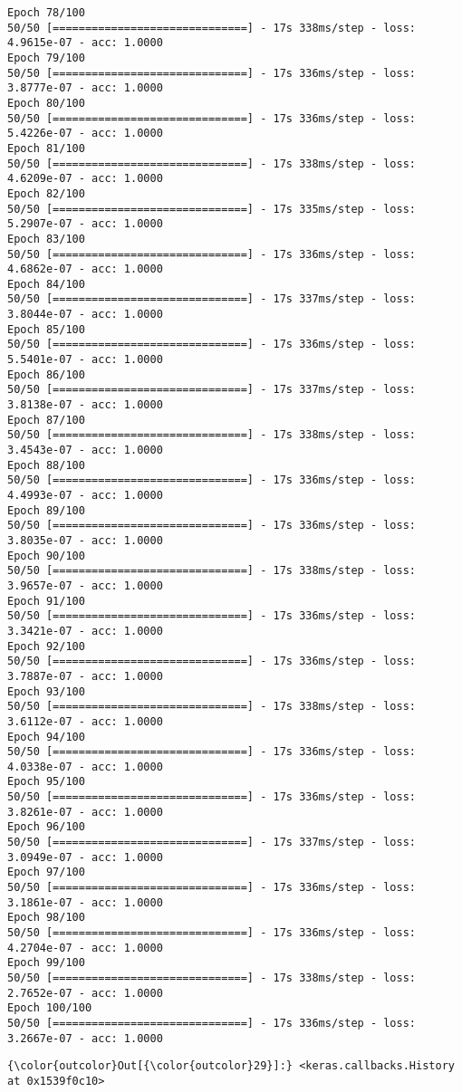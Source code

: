 \documentclass[11pt]{article}
\begin{document}
\begin{Verbatim}[commandchars=\\\{\}]
Epoch 78/100
50/50 [==============================] - 17s 338ms/step - loss: 4.9615e-07 - acc: 1.0000
Epoch 79/100
50/50 [==============================] - 17s 336ms/step - loss: 3.8777e-07 - acc: 1.0000
Epoch 80/100
50/50 [==============================] - 17s 336ms/step - loss: 5.4226e-07 - acc: 1.0000
Epoch 81/100
50/50 [==============================] - 17s 338ms/step - loss: 4.6209e-07 - acc: 1.0000
Epoch 82/100
50/50 [==============================] - 17s 335ms/step - loss: 5.2907e-07 - acc: 1.0000
Epoch 83/100
50/50 [==============================] - 17s 336ms/step - loss: 4.6862e-07 - acc: 1.0000
Epoch 84/100
50/50 [==============================] - 17s 337ms/step - loss: 3.8044e-07 - acc: 1.0000
Epoch 85/100
50/50 [==============================] - 17s 336ms/step - loss: 5.5401e-07 - acc: 1.0000
Epoch 86/100
50/50 [==============================] - 17s 337ms/step - loss: 3.8138e-07 - acc: 1.0000
Epoch 87/100
50/50 [==============================] - 17s 338ms/step - loss: 3.4543e-07 - acc: 1.0000
Epoch 88/100
50/50 [==============================] - 17s 336ms/step - loss: 4.4993e-07 - acc: 1.0000
Epoch 89/100
50/50 [==============================] - 17s 336ms/step - loss: 3.8035e-07 - acc: 1.0000
Epoch 90/100
50/50 [==============================] - 17s 338ms/step - loss: 3.9657e-07 - acc: 1.0000
Epoch 91/100
50/50 [==============================] - 17s 336ms/step - loss: 3.3421e-07 - acc: 1.0000
Epoch 92/100
50/50 [==============================] - 17s 336ms/step - loss: 3.7887e-07 - acc: 1.0000
Epoch 93/100
50/50 [==============================] - 17s 338ms/step - loss: 3.6112e-07 - acc: 1.0000
Epoch 94/100
50/50 [==============================] - 17s 336ms/step - loss: 4.0338e-07 - acc: 1.0000
Epoch 95/100
50/50 [==============================] - 17s 336ms/step - loss: 3.8261e-07 - acc: 1.0000
Epoch 96/100
50/50 [==============================] - 17s 337ms/step - loss: 3.0949e-07 - acc: 1.0000
Epoch 97/100
50/50 [==============================] - 17s 336ms/step - loss: 3.1861e-07 - acc: 1.0000
Epoch 98/100
50/50 [==============================] - 17s 336ms/step - loss: 4.2704e-07 - acc: 1.0000
Epoch 99/100
50/50 [==============================] - 17s 338ms/step - loss: 2.7652e-07 - acc: 1.0000
Epoch 100/100
50/50 [==============================] - 17s 336ms/step - loss: 3.2667e-07 - acc: 1.0000

    \end{Verbatim}

\begin{Verbatim}[commandchars=\\\{\}]
{\color{outcolor}Out[{\color{outcolor}29}]:} <keras.callbacks.History at 0x1539f0c10>
\end{Verbatim}
            
\end{document}

